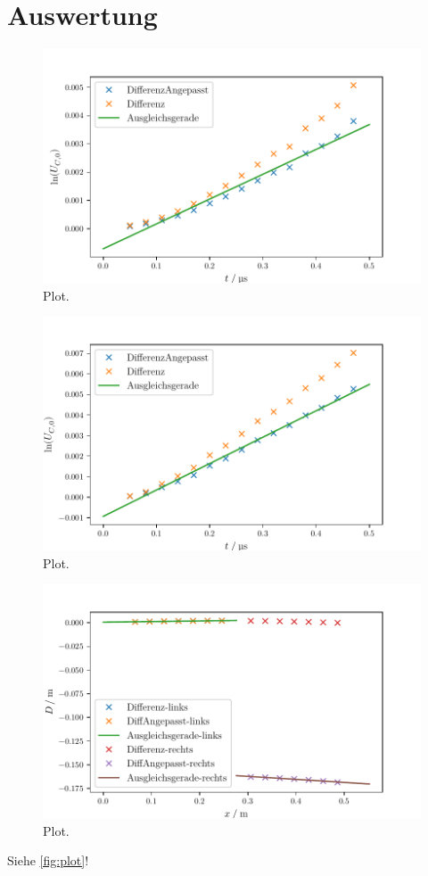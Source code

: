 \section{Auswertung}
\label{sec:Auswertung}

\begin{figure}
  \centering
  \includegraphics{build/plot1.pdf}
  \caption{Plot.}
  \label{fig:plot}
\end{figure}


\begin{figure}
  \centering
  \includegraphics{build/plot2.pdf}
  \caption{Plot.}
  \label{fig:plot}
\end{figure}

\begin{figure}
  \centering
  \includegraphics{build/plot3.pdf}
  \caption{Plot.}
  \label{fig:plot}
\end{figure}


Siehe \autoref{fig:plot}!
